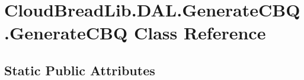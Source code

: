 \hypertarget{class_cloud_bread_lib_1_1_d_a_l_1_1_generate_c_b_q_1_1_generate_c_b_q}{}\section{Cloud\+Bread\+Lib.\+D\+A\+L.\+Generate\+C\+B\+Q.\+Generate\+C\+BQ Class Reference}
\label{class_cloud_bread_lib_1_1_d_a_l_1_1_generate_c_b_q_1_1_generate_c_b_q}
\subsection*{Static Public Attributes}
\begin{DoxyCompactItemize}
\item 

\end{DoxyCompactItemize}

